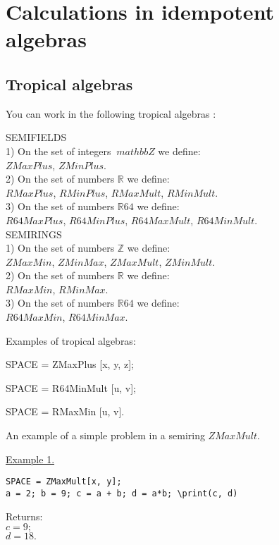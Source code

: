 \chapter{Calculations in idempotent algebras}


\section {Tropical algebras}
You can work in the following tropical algebras :

SEMIFIELDS\\
1) On the set of integers $ {\ mathbb Z} $ we define: \\
$ZMaxPlus$,  
$ZMinPlus$.\\
2) On the set of numbers ${\mathbb R}$ we define:\\
$RMaxPlus$, 
$RMinPlus$,  
$RMaxMult$,  
$RMinMult$.\\
3) On the set of numbers ${\mathbb R}64$ we define:\\
$R64MaxPlus$, 
$R64MinPlus$,  
$R64MaxMult$,  
$R64MinMult$.\\

SEMIRINGS\\
1) On the set of numbers ${\mathbb Z}$ we define:\\ 
$ZMaxMin$,
$ZMinMax$,
$ZMaxMult$,
$ZMinMult$.\\
2) On the set of numbers ${\mathbb R}$ we define:\\
$RMaxMin$, 
$RMinMax$.\\
3) On the set of numbers ${\mathbb R}64$ we define:\\
$R64MaxMin$, 
$R64MinMax$.

 

Examples of tropical algebras: 

SPACE = ZMaxPlus [x,  y,  z]; 

SPACE = R64MinMult [u,  v];  

SPACE = RMaxMin [u,  v]. 

 An example of a simple problem in a semiring
 $ZMaxMult$.
\smallskip

\underline{Example 1. }

\begin{verbatim}
SPACE = ZMaxMult[x, y];
a = 2; b = 9; c = a + b; d = a*b; \print(c, d)
\end{verbatim}

Returns:\\
$c = 9; $\\
$d = 18.$

